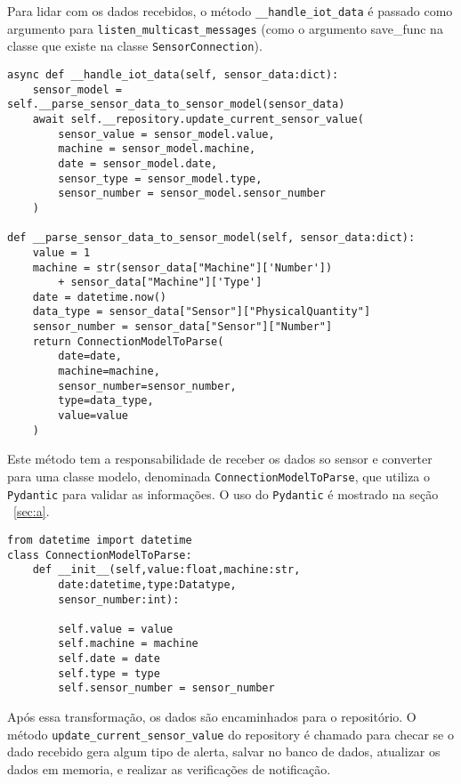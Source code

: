 Para lidar com os dados recebidos, o método \texttt{\_\_handle\_iot\_data} é passado como argumento para \texttt{listen\_multicast\_messages} (como o argumento save\_func na classe que existe na classe \texttt{SensorConnection}).

\begin{verbatim}
async def __handle_iot_data(self, sensor_data:dict):
    sensor_model = self.__parse_sensor_data_to_sensor_model(sensor_data)
    await self.__repository.update_current_sensor_value(
        sensor_value = sensor_model.value,
        machine = sensor_model.machine,
        date = sensor_model.date,
        sensor_type = sensor_model.type,
        sensor_number = sensor_model.sensor_number
    )

def __parse_sensor_data_to_sensor_model(self, sensor_data:dict):
    value = 1
    machine = str(sensor_data["Machine"]['Number']) 
        + sensor_data["Machine"]['Type']
    date = datetime.now()
    data_type = sensor_data["Sensor"]["PhysicalQuantity"]
    sensor_number = sensor_data["Sensor"]["Number"]
    return ConnectionModelToParse(
        date=date,
        machine=machine,
        sensor_number=sensor_number,
        type=data_type,
        value=value
    )
\end{verbatim}

Este método tem a responsabilidade de receber os dados so sensor e converter para uma classe modelo, denominada \texttt{ConnectionModelToParse}, que utiliza o \texttt{Pydantic} para validar as informações. O uso do \texttt{Pydantic} é mostrado na seção ~\ref{sec:a}.

\begin{verbatim}
from datetime import datetime
class ConnectionModelToParse:
    def __init__(self,value:float,machine:str,
        date:datetime,type:Datatype,
        sensor_number:int):

        self.value = value
        self.machine = machine
        self.date = date
        self.type = type
        self.sensor_number = sensor_number
\end{verbatim}

Após essa transformação, os dados são encaminhados para o repositório. O método \texttt{update\_current\_sensor\_value} do repository é chamado para checar se o dado recebido gera algum tipo de alerta, salvar no banco de dados, atualizar os dados em memoria, e realizar as verificações de notificação.

